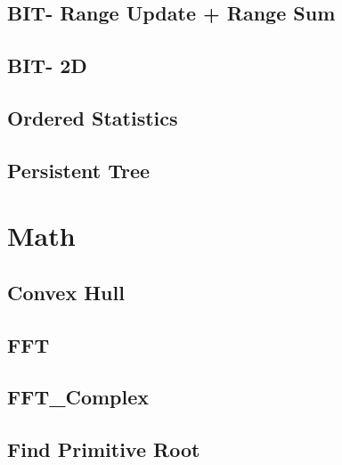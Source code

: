 \documentclass[12pt]{extarticle}
\begin{document}
\begin{multicols*}{2}
% 

\subsection{BIT- Range Update + Range Sum} %


\subsection{BIT- 2D} %


\subsection{Ordered Statistics} %

\subsection{Persistent Tree} %


\section{Math}

\subsection{Convex Hull} %


\subsection{FFT} %


\subsection{FFT\_Complex} %


\subsection{Find Primitive Root } %



\end{multicols*}
\end{document}
